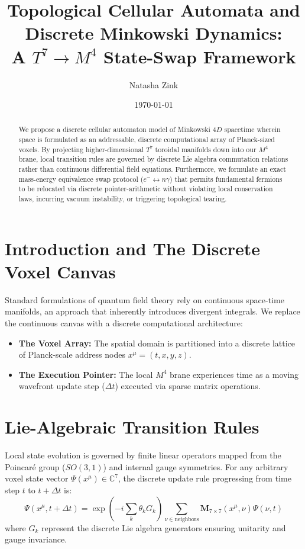 \documentclass[11pt,a4paper]{article}
\title{Topological Cellular Automata and Discrete Minkowski Dynamics: \\ A $T^7 \rightarrow M^4$ State-Swap Framework}
\author{Natasha Zink}
\date{\today}
\begin{document}
\maketitle

\begin{abstract}
We propose a discrete cellular automaton model of Minkowski $4D$ spacetime wherein space is formulated as an addressable, discrete computational array of Planck-sized voxels. By projecting higher-dimensional $T^7$ toroidal manifolds down into our $M^4$ brane, local transition rules are governed by discrete Lie algebra commutation relations rather than continuous differential field equations. Furthermore, we formulate an exact mass-energy equivalence swap protocol ($e^- \leftrightarrow n\gamma$) that permits fundamental fermions to be relocated via discrete pointer-arithmetic without violating local conservation laws, incurring vacuum instability, or triggering topological tearing.
\end{abstract}

\section{Introduction and The Discrete Voxel Canvas}
Standard formulations of quantum field theory rely on continuous space-time manifolds, an approach that inherently introduces divergent integrals. We replace the continuous canvas with a discrete computational architecture:
\begin{itemize}
    \item \textbf{The Voxel Array:} The spatial domain is partitioned into a discrete lattice of Planck-scale address nodes $x^\mu = (t, x, y, z)$.
    \item \textbf{The Execution Pointer:} The local $M^4$ brane experiences time as a moving wavefront update step ($\Delta t$) executed via sparse matrix operations.
\end{itemize}

\section{Lie-Algebraic Transition Rules}
Local state evolution is governed by finite linear operators mapped from the Poincaré group ($SO(3,1)$) and internal gauge symmetries. For any arbitrary voxel state vector $\Psi(x^\mu) \in \mathbb{C}^7$, the discrete update rule progressing from time step $t$ to $t + \Delta t$ is:
\begin{equation}
\Psi(x^\mu, t + \Delta t) = \exp\left( -i \sum_k \theta_k G_k \right) \sum_{\nu \in \text{neighbors}} \mathbf{M}_{7 \times 7}(x^\mu, \nu) \Psi(\nu, t)
\end{equation}
where $G_k$ represent the discrete Lie algebra generators ensuring unitarity and gauge invariance.
\end{document}
